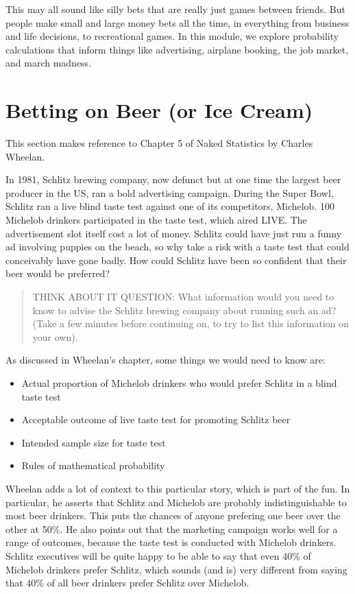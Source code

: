 \documentclass[
  openany]{book}
\providecommand{\tightlist}{%
  \setlength{\itemsep}{0pt}\setlength{\parskip}{0pt}}
\begin{document}
This may all sound like silly bets that are really just games between friends. But people make small and large money bets all the time, in everything from business and life decisions, to recreational games. In this module, we explore probability calculations that inform things like advertising, airplane booking, the job market, and march madness.

\hypertarget{betting-on-beer-or-ice-cream}{%
\chapter{Betting on Beer (or Ice Cream)}\label{betting-on-beer-or-ice-cream}}

This section makes reference to Chapter 5 of Naked Statistics by Charles Wheelan.

In 1981, Schlitz brewing company, now defunct but at one time the largest beer producer in the US, ran a bold advertising campaign. During the Super Bowl, Schlitz ran a live blind taste test against one of its competitors, Michelob. 100 Michelob drinkers participated in the taste test, which aired LIVE. The advertisement slot itself cost a lot of money. Schlitz could have just run a funny ad involving puppies on the beach, so why take a risk with a taste test that could conceivably have gone badly. How could Schlitz have been so confident that their beer would be preferred?

\begin{quote}
THINK ABOUT IT QUESTION: What information would you need to know to advise the Schlitz brewing company about running such an ad? (Take a few minutes before continuing on, to try to list this information on your own).
\end{quote}

As discussed in Wheelan's chapter, some things we would need to know are:

\begin{itemize}
\tightlist
\item
  Actual proportion of Michelob drinkers who would prefer Schlitz in a blind taste test
\item
  Acceptable outcome of live taste test for promoting Schlitz beer
\item
  Intended sample size for taste test
\item
  Rules of mathematical probability
\end{itemize}

Wheelan adds a lot of context to this particular story, which is part of the fun. In particular, he asserts that Schlitz and Michelob are probably indistinguishable to most beer drinkers. This puts the chances of anyone prefering one beer over the other at 50\%. He also points out that the marketing campaign works well for a range of outcomes, because the taste test is conducted with Michelob drinkers. Schlitz executives will be quite happy to be able to say that even 40\% of Michelob drinkers prefer Schlitz, which sounds (and is) very different from saying that 40\% of all beer drinkers prefer Schlitz over Michelob.
\end{document}
